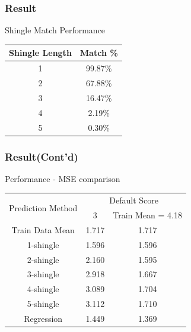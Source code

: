 \documentclass[11pt]{beamer}
\begin{document}
\begin{frame}
\frametitle{Result}

	\centering
	Shingle Match Performance

	\begin{center}
		\begin{tabular}{cc}
			\toprule
				Shingle Length & Match \% \\
			\midrule
				1 & 99.87\% \\
				2 & 67.88\% \\
				3 & 16.47\% \\
				4 & 2.19\% \\
				5 & 0.30\% \\
			\bottomrule
		\end{tabular}
	\end{center}
	\vspace{5mm}




\end{frame}

\begin{frame}
\frametitle{Result(Cont'd)}

	\centering
	Performance - MSE comparison

	\begin{center}
	
		\begin{tabular}{ccc}
			\toprule
				\multirow{2}{*}{Prediction Method} &
				\multicolumn{2}{c}{Default Score}\\
				\cline{2-3}
				& 3 & Train Mean = 4.18 \\
			\midrule
				Train Data Mean & 1.717 & 1.717 \\
				\hline
				1-shingle & 1.596 & 1.596\\
				2-shingle & 2.160 & 1.595\\
				3-shingle & 2.918 & 1.667\\
				4-shingle & 3.089 & 1.704\\
				5-shingle & 3.112 & 1.710\\
				\hline
				Regression & 1.449 & 1.369\\
				
			\bottomrule
		\end{tabular}
	\end{center}
	\vspace{5mm}

\end{frame}
\end{document}
